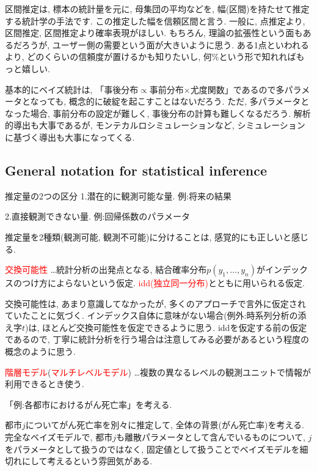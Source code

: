 \documentclass[11pt,a4pape,dvipdfmx]{jarticle}
\newcommand{\tcr}[1]{\textcolor{red}{#1}}
\begin{document}
区間推定は, 標本の統計量を元に, 母集団の平均などを, 幅(区間)を持たせて推定する統計学の手法です.
この推定した幅を信頼区間と言う.
一般に, 点推定より, 区間推定, 区間推定より確率表現がほしい.
もちろん, 理論の拡張性という面もあるだろうが, ユーザー側の需要という面が大きいように思う.
ある1点といわれるより, どのくらいの信頼度が置けるかも知りたいし, 何\%という形で知れればもっと嬉しい.

基本的にベイズ統計は, 「事後分布$\propto$事前分布$\times$尤度関数」であるので多パラメータとなっても, 概念的に破綻を起こすことはないだろう.
ただ, 多パラメータとなった場合, 事前分布の設定が難しく, 事後分布の計算も難しくなるだろう.
解析的導出も大事であるが, モンテカルロシミュレーションなど, シミュレーションに基づく導出も大事になってくる.

\subsection{General notation for statistical inference}
\begin{itembox}[l]{推定量の2つの区分}
1.潜在的に観測可能な量. 例:将来の結果

2.直接観測できない量. 例:回帰係数のパラメータ
\end{itembox}

推定量を2種類(観測可能, 観測不可能)に分けることは, 感覚的にも正しいと感じる.


\begin{itembox}[l]{\tcr{交換可能性}}
…統計分析の出発点となる, 結合確率分布$p(y_1,\dots,y_n)$がインデックスのつけ方によらないという仮定.
\tcr{idd(独立同一分布)}とともに用いられる仮定.
\end{itembox}

交換可能性は, あまり意識してなかったが, 多くのアプローチで言外に仮定されていたことに気づく.
インデックス自体に意味がない場合(例外:時系列分析の添え字$t$)は, ほとんど交換可能性を仮定できるように思う.
iddを仮定する前の仮定であるので, 丁寧に統計分析を行う場合は注意してみる必要があるという程度の概念のように思う.


\begin{itembox}[l]{\tcr{階層モデル}(\tcr{マルチレベルモデル})}
…複数の異なるレベルの観測ユニットで情報が利用できるとき使う.
\end{itembox}

「例:各都市におけるがん死亡率」を考える.

都市$j$についてがん死亡率を別々に推定して, 全体の背景(がん死亡率)を考える.
完全なベイズモデルで, 都市$j$も離散パラメータとして含んでいるものについて, $j$をパラメータとして扱うのではなく, 固定値として扱うことでベイズモデルを細切れにして考えるという雰囲気がある.
\end{document}
